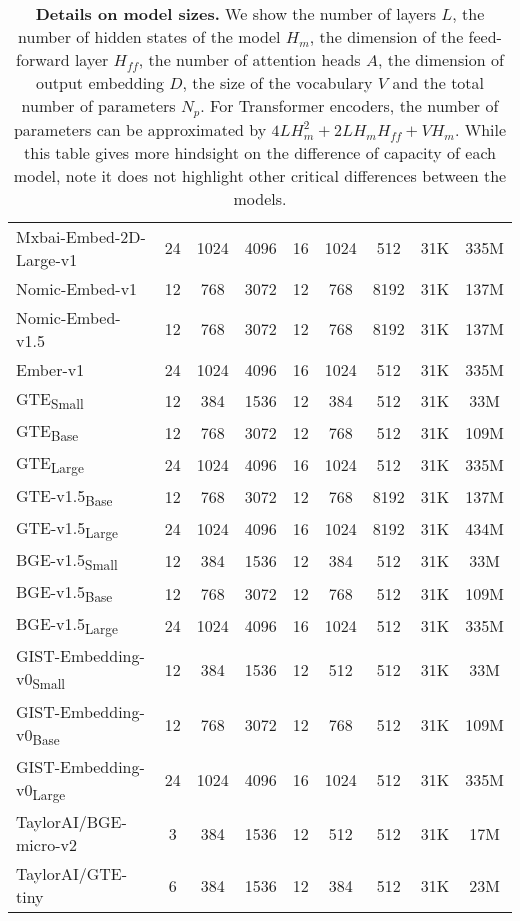 \begin{table*}[ht!]
\begin{tabular}{lcccccccc}
      Mxbai-Embed-2D-Large-v1 & 24 & 1024 & 4096 & 16 & 1024 & 512 & 31K & 335M \\
      Nomic-Embed-v1 & 12 & 768 & 3072 & 12 & 768 & 8192 & 31K & 137M \\
      Nomic-Embed-v1.5 & 12 & 768 & 3072 & 12 & 768 & 8192 & 31K & 137M \\
      Ember-v1 & 24 & 1024 & 4096 & 16 & 1024 & 512 & 31K & 335M \\
      GTE\textsubscript{Small} & 12 & 384 & 1536 & 12 & 384 & 512 & 31K & 33M \\
      GTE\textsubscript{Base} & 12 & 768 & 3072 & 12 & 768 & 512 & 31K & 109M \\
      GTE\textsubscript{Large} & 24 & 1024 & 4096 & 16 & 1024 & 512 & 31K & 335M \\
      GTE-v1.5\textsubscript{Base} & 12 & 768 & 3072 & 12 & 768 & 8192 & 31K & 137M \\
      GTE-v1.5\textsubscript{Large} & 24 & 1024 & 4096 & 16 & 1024 & 8192 & 31K & 434M \\
      BGE-v1.5\textsubscript{Small} & 12 & 384 & 1536 & 12 & 384 & 512 & 31K & 33M \\
      BGE-v1.5\textsubscript{Base} & 12 & 768 & 3072 & 12 & 768 & 512 & 31K & 109M \\
      BGE-v1.5\textsubscript{Large} & 24 & 1024 & 4096 & 16 & 1024 & 512 & 31K & 335M \\
      GIST-Embedding-v0\textsubscript{Small} & 12 & 384 & 1536 & 12 & 512 & 512 & 31K & 33M \\
      GIST-Embedding-v0\textsubscript{Base}  & 12 & 768 & 3072 & 12 & 768 & 512 & 31K & 109M \\
      GIST-Embedding-v0\textsubscript{Large} & 24 & 1024 & 4096 & 16 & 1024 & 512 & 31K & 335M \\
      TaylorAI/BGE-micro-v2 & 3 & 384 & 1536 & 12 & 512 & 512 & 31K & 17M \\
      TaylorAI/GTE-tiny & 6 & 384 & 1536 & 12 & 384 & 512 & 31K & 23M \\
      \bottomrule
    \end{tabular}
    \caption{\textbf{Details on model sizes.}
            We show the number of layers $L$, the number of hidden states of the model $H_{m}$, the dimension of the feed-forward layer $H_{ff}$, the number of attention heads $A$, the dimension of output embedding $D$, the size of the vocabulary $V$ and the total number of parameters $N_p$. 
            For Transformer encoders, the number of parameters can be approximated by $4LH_m^2 + 2LH_m H_{ff} + VH_m$.
            While this table gives more hindsight on the difference of capacity of each model, note it does not highlight other critical differences between the models.}
    \label{tab:parameters}
  \end{table*}
  